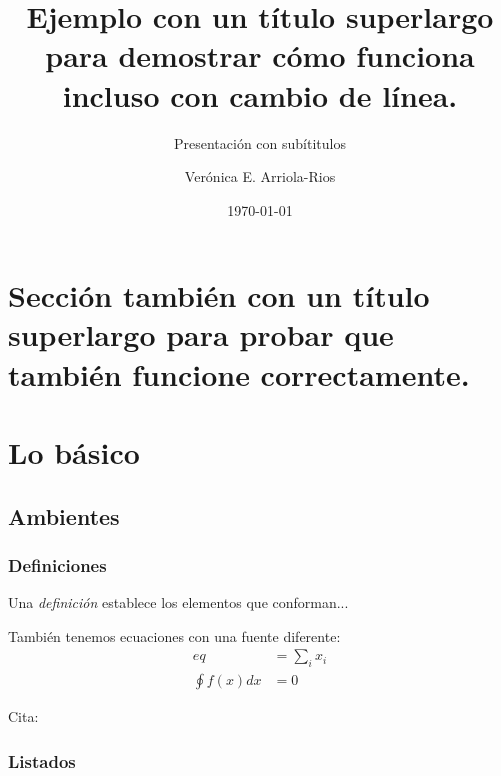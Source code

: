 \documentclass[aspectratio=169,usenames,dvipsnames,svgnames,table]{beamer}
\title{Ejemplo con un título superlargo para demostrar cómo funciona incluso con cambio de línea.}
\subtitle{Presentación con subítitulos}
\author[Ver\'onica E. Arriola-Rios]{Verónica E. Arriola-Rios}
\institute{Facultad de Ciencias, UNAM}
\date{\today}
\begin{document}
\frame{\titlepage}

\section[SLarga]{Sección también con un título superlargo para probar que también funcione correctamente.}

\section{Lo básico}

\subsection{Ambientes}

\subsubsection{Definiciones}

\begin{frame}
\begin{definition}[Definición]
 Una \emph{definición} establece los elementos que conforman...
\end{definition}

También tenemos ecuaciones con una fuente diferente:
\begin{align}
 eq &= \sum_{i} x_i \\
 \oint f(x) dx &= 0
\end{align}

Cita: \cite{Viso2012}

\end{frame}


\subsubsection{Listados}
\end{document}

